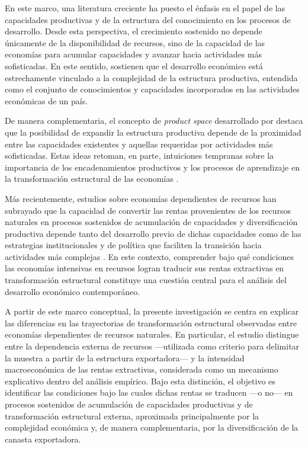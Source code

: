 \documentclass[../../PTFM.tex]{subfiles}
\begin{document}
	En este marco, una literatura creciente ha puesto el énfasis en el papel de las capacidades productivas y de la estructura del conocimiento en los procesos de desarrollo. Desde esta perspectiva, el crecimiento sostenido no depende únicamente de la disponibilidad de recursos, sino de la capacidad de las economías para acumular capacidades y avanzar hacia actividades más sofisticadas. En este sentido, \textcite{Hausmann2014} sostienen que el desarrollo económico está estrechamente vinculado a la complejidad de la estructura productiva, entendida como el conjunto de conocimientos y capacidades incorporados en las actividades económicas de un país.

	De manera complementaria, el concepto de \textit{product space} desarrollado por \textcite{Hausmann2007} destaca que la posibilidad de expandir la estructura productiva depende de la proximidad entre las capacidades existentes y aquellas requeridas por actividades más sofisticadas. Estas ideas retoman, en parte, intuiciones tempranas sobre la importancia de los encadenamientos productivos y los procesos de aprendizaje en la transformación estructural de las economías \parencite{Hirschman1958}.

	Más recientemente, estudios sobre economías dependientes de recursos han subrayado que la capacidad de convertir las rentas provenientes de los recursos naturales en procesos sostenidos de acumulación de capacidades y diversificación productiva depende tanto del desarrollo previo de dichas capacidades como de las estrategias institucionales y de política que faciliten la transición hacia actividades más complejas \parencite{Lebdioui2019}. En este contexto, comprender bajo qué condiciones las economías intensivas en recursos logran traducir sus rentas extractivas en transformación estructural constituye una cuestión central para el análisis del desarrollo económico contemporáneo.

	A partir de este marco conceptual, la presente investigación se centra en explicar las diferencias en las trayectorias de transformación estructural observadas entre economías dependientes de recursos naturales. En particular, el estudio distingue entre la dependencia externa de recursos ---utilizada como criterio para delimitar la muestra a partir de la estructura exportadora--- y la intensidad macroeconómica de las rentas extractivas, considerada como un mecanismo explicativo dentro del análisis empírico. Bajo esta distinción, el objetivo es identificar las condiciones bajo las cuales dichas rentas se traducen ---o no--- en procesos sostenidos de acumulación de capacidades productivas y de transformación estructural externa, aproximada principalmente por la complejidad económica y, de manera complementaria, por la diversificación de la canasta exportadora.
\end{document}
